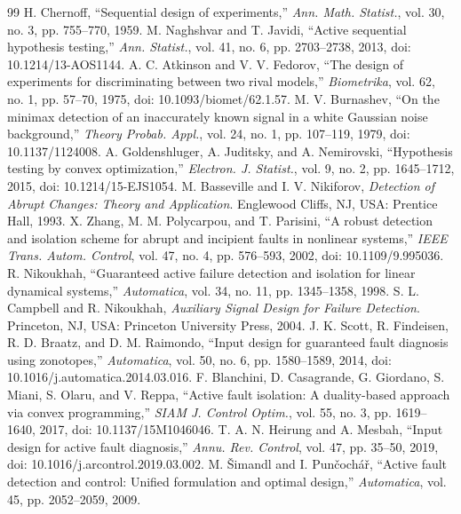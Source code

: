 \begin{thebibliography}{99}
 H. Chernoff, ``Sequential design of experiments,'' \emph{Ann. Math. Statist.}, vol. 30, no. 3, pp. 755--770, 1959.
 M. Naghshvar and T. Javidi, ``Active sequential hypothesis testing,'' \emph{Ann. Statist.}, vol. 41, no. 6, pp. 2703--2738, 2013, doi: 10.1214/13-AOS1144.
 A. C. Atkinson and V. V. Fedorov, ``The design of experiments for discriminating between two rival models,'' \emph{Biometrika}, vol. 62, no. 1, pp. 57--70, 1975, doi: 10.1093/biomet/62.1.57.
 M. V. Burnashev, ``On the minimax detection of an inaccurately known signal in a white Gaussian noise background,'' \emph{Theory Probab. Appl.}, vol. 24, no. 1, pp. 107--119, 1979, doi: 10.1137/1124008.
 A. Goldenshluger, A. Juditsky, and A. Nemirovski, ``Hypothesis testing by convex optimization,'' \emph{Electron. J. Statist.}, vol. 9, no. 2, pp. 1645--1712, 2015, doi: 10.1214/15-EJS1054.
 M. Basseville and I. V. Nikiforov, \emph{Detection of Abrupt Changes: Theory and Application}. Englewood Cliffs, NJ, USA: Prentice Hall, 1993.
 X. Zhang, M. M. Polycarpou, and T. Parisini, ``A robust detection and isolation scheme for abrupt and incipient faults in nonlinear systems,'' \emph{IEEE Trans. Autom. Control}, vol. 47, no. 4, pp. 576--593, 2002, doi: 10.1109/9.995036.
 R. Nikoukhah, ``Guaranteed active failure detection and isolation for linear dynamical systems,'' \emph{Automatica}, vol. 34, no. 11, pp. 1345--1358, 1998.
 S. L. Campbell and R. Nikoukhah, \emph{Auxiliary Signal Design for Failure Detection}. Princeton, NJ, USA: Princeton University Press, 2004.
 J. K. Scott, R. Findeisen, R. D. Braatz, and D. M. Raimondo, ``Input design for guaranteed fault diagnosis using zonotopes,'' \emph{Automatica}, vol. 50, no. 6, pp. 1580--1589, 2014, doi: 10.1016/j.automatica.2014.03.016.
 F. Blanchini, D. Casagrande, G. Giordano, S. Miani, S. Olaru, and V. Reppa, ``Active fault isolation: A duality-based approach via convex programming,'' \emph{SIAM J. Control Optim.}, vol. 55, no. 3, pp. 1619--1640, 2017, doi: 10.1137/15M1046046.
 T. A. N. Heirung and A. Mesbah, ``Input design for active fault diagnosis,'' \emph{Annu. Rev. Control}, vol. 47, pp. 35--50, 2019, doi: 10.1016/j.arcontrol.2019.03.002.
 M. \v{S}imandl and I. Pun\v{c}och\'{a}\v{r}, ``Active fault detection and control: Unified formulation and optimal design,'' \emph{Automatica}, vol. 45, pp. 2052--2059, 2009.

\end{thebibliography}
